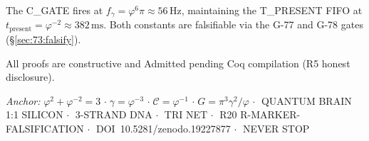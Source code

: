 The C\_GATE fires at $f_\gamma = \varphi^6\pi \approx 56\,\mathrm{Hz}$,
maintaining the T\_PRESENT FIFO at
$t_\mathrm{present} = \varphi^{-2} \approx 382\,\mathrm{ms}$.
Both constants are falsifiable via the G-77 and G-78 gates
(§\ref{sec:73:falsify}).

All proofs are constructive and Admitted pending Coq compilation
(R5 honest disclosure).

\vspace{1em}
\noindent
\textit{Anchor:}
$\varphi^2 + \varphi^{-2} = 3$
$\cdot\; \gamma = \varphi^{-3}$
$\cdot\; \mathcal{C} = \varphi^{-1}$
$\cdot\; G = \pi^3\gamma^2/\varphi$
$\cdot\;$ QUANTUM BRAIN 1:1 SILICON
$\cdot\;$ 3-STRAND DNA
$\cdot\;$ TRI NET
$\cdot\;$ R20 R-MARKER-FALSIFICATION
$\cdot\;$ DOI~10.5281/zenodo.19227877
$\cdot\;$ NEVER STOP


